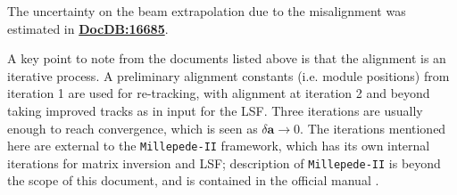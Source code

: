 \documentclass[12pt]{article}
\begin{document}
The uncertainty on the beam extrapolation due to the misalignment was estimated in \textbf{\href{https://gm2-docdb.fnal.gov/cgi-bin/private/ShowDocument?docid=16685}{DocDB:16685}}. 

A key point to note from the documents listed above is that the alignment is an iterative process. A preliminary alignment constants (i.e. module positions) from iteration 1 are used for re-tracking, with alignment at iteration 2 and beyond taking improved tracks as in input for the LSF. Three iterations are usually enough to reach convergence, which is seen as $\delta\boldsymbol{a} \rightarrow 0$. The iterations mentioned here are external to the \texttt{Millepede-II} framework, which has its own internal iterations for matrix inversion and LSF; description of \texttt{Millepede-II} is beyond the scope of this document, and is contained in the official manual \cite{mp2}.   
\end{document}

